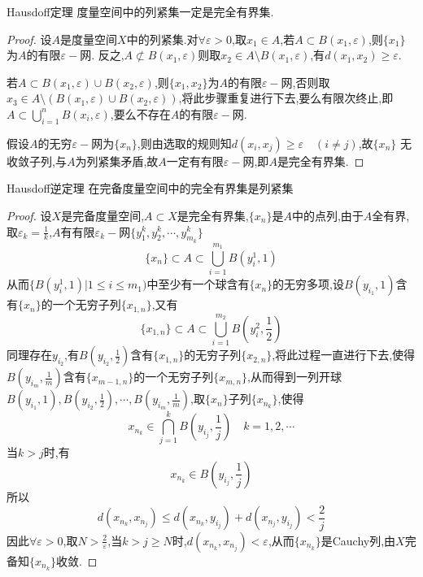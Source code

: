 \documentclass[lang=cn,18pt]{elegantbook}
\begin{document}
\begin{theorem}{Hausdoff定理}
    度量空间中的列紧集一定是完全有界集.
\end{theorem}
\begin{proof}
     设$A$是度量空间$X$中的列紧集.对$\forall{\varepsilon} >0$,取$x_1 \in A$,若$A \subset B(x_1,\varepsilon)$,则$\{x_1\}$为$A$的有限$\varepsilon -$网.
     反之,$A \not\subset B(x_1,\varepsilon)$则取$x_2 \in A \setminus B(x_1,\varepsilon)$,有$d(x_1,x_2)\geqslant \varepsilon$.
     
     若$A \subset B(x_1,\varepsilon) \cup B(x_2,\varepsilon)$,则$\{x_1,x_2\}$为$A$的有限$\varepsilon -$网,否则取$x_3 \in A\setminus (B(x_1,\varepsilon) \cup B(x_2,\varepsilon))$,将此步骤重复进行下去,要么有限次终止,即$A \subset \bigcup\limits_{i=1}^{n}B(x_i,\varepsilon)$,要么不存在$A$的有限$\varepsilon -$网.

     假设$A$的无穷$\varepsilon -$网为$\{x_n\}$,则由选取的规则知$d(x_i,x_j)\geqslant \varepsilon \quad (i \not= j)$,故$\{x_n \}$ 无收敛子列,与$A$为列紧集矛盾,故$A$一定有有限$\varepsilon -$网,即$A$是完全有界集.
\end{proof}


\begin{theorem}{Hausdoff逆定理}
    在完备度量空间中的完全有界集是列紧集
\end{theorem}
\begin{proof}
    设$X$是完备度量空间,$A \subset X$是完全有界集,$\{x_n\}$是$A$中的点列,由于$A$全有界,取$\varepsilon_k=\frac{1}{k}$,$A$有有限$\varepsilon_k -$网$\{y_1^k,y_2^k,\cdots,y_{m_k}^k\}$
    $$\{x_n\} \subset A \subset \bigcup\limits_{i=1}^{m_1}B(y_i^1,1)$$
    从而$\{B(y_i^1,1)| 1\leqslant i \leqslant m_1)$中至少有一个球含有$\{x_n\}$的无穷多项,设$B(y_{i_1},1)$含有$\{x_n\}$的一个无穷子列$\{x_{1,n}\}$,又有
    $$\{x_{1,n}\} \subset A \subset \bigcup\limits_{i=1}^{m_2}B(y_i^2,\frac{1}{2})$$
    同理存在$y_{i_2}$,有$B(y_{i_2},\frac{1}{2})$含有$\{x_{1,n}\}$的无穷子列$\{x_{2,n}\}$,将此过程一直进行下去,使得$B(y_{i_m},\frac{1}{m})$含有$\{x_{m-1,n}\}$的一个无穷子列$\{x_{m,n}\}$,从而得到一列开球$B(y_{i_1},1),B(y_{i_2},\frac{1}{2}),\cdots,B(y_{i_m},\frac{1}{m})$,取$\{x_n\}$子列$\{x_{n_k}\}$,使得
    $$x_{n_k}\in \bigcap\limits_{j=1}^{k}B(y_{i_j},\frac{1}{j}) \quad k=1,2,\cdots$$
    当$k>j$时,有
    $$x_{n_k}\in B(y_{i_j},\frac{1}{j})$$
    所以
    $$d(x_{n_k},x_{n_j}) \leqslant d(x_{n_k},y_{i_j})+d(x_{n_j},y_{i_j})<\frac{2}{j}$$
    因此$\forall \varepsilon >0$,取$N >\frac{2}{\varepsilon}$,当$k>j\geqslant N$时,$d(x_{n_k},x_{n_j})< \varepsilon$,从而$\{x_{n_k}\}$是Cauchy列,由$X$完备知$\{x_{n_k}\}$收敛.
\end{proof}
\begin{note}
    
\end{note}
\end{document}
